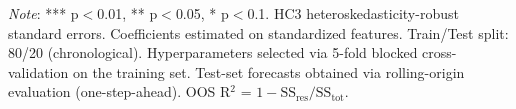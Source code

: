 \par\vspace{4pt}
\begin{minipage}{\linewidth}
  \footnotesize \textit{Note}: *** p$<$0.01, ** p$<$0.05, * p$<$0.1. HC3 heteroskedasticity-robust standard errors. Coefficients estimated on standardized features. Train/Test split: 80/20 (chronological). Hyperparameters selected via 5-fold blocked cross-validation on the training set. Test-set forecasts obtained via rolling-origin evaluation (one-step-ahead). OOS R$^2$ = $1 - \text{SS}_{\text{res}} / \text{SS}_{\text{tot}}$.
\end{minipage}